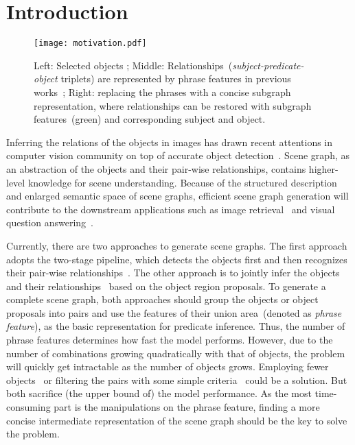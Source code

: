 \documentclass[runningheads]{llncs}
\begin{document}
\section{Introduction}

\begin{figure}[t]
\texttt{[image: motivation.pdf]}	
\caption{Left: Selected objects ; Middle: Relationships~(\emph{subject-predicate-object} triplets) are represented by phrase features in previous works~\cite{visual_relationship,visual_genome,li2017vip,li2017scene,xu2017scene,dai2017detecting,zhuang2017towards}; Right: replacing the phrases with a concise subgraph representation, where relationships can be restored with subgraph features~(green) and corresponding subject and object. }
\label{fig:motivation}
\end{figure}

Inferring the relations of the objects in images has drawn recent attentions in computer vision community on top of accurate object detection~\cite{visual_relationship,visual_genome,li2017vip,li2017scene,xu2017scene,dai2017detecting,zhuang2017towards}. Scene graph, as an abstraction of the objects and their pair-wise relationships, contains higher-level knowledge for scene understanding. Because of the structured description and enlarged semantic space of scene graphs, efficient scene graph generation will contribute to the downstream applications such as image retrieval~\cite{visual_phrase_for_retrieval, johnson2015image} and visual question answering~\cite{li2018visual, lu2018co-attending}.

Currently, there are two approaches to generate scene graphs. The first approach adopts the two-stage pipeline, which detects the objects first and then recognizes their pair-wise relationships~\cite{visual_relationship,xu2017scene,dai2017detecting,yu2017visual,liao2017natural}. The other approach is to jointly infer the objects and their relationships~\cite{li2017vip,li2017scene,xu2017scene} based on the object region proposals.  
To generate a complete scene graph, both approaches should group the objects or object proposals into pairs and use the features of their union area~(denoted as \emph{phrase feature}), as the basic representation for predicate inference. Thus, the number of phrase features determines how fast the model performs. However, due to the number of combinations growing quadratically with that of objects, the problem will quickly get intractable as the number of objects grows. Employing fewer objects~\cite{xu2017scene,li2017scene} or filtering the pairs with some simple criteria~\cite{li2017vip,dai2017detecting} could be a solution. But both sacrifice (the upper bound of) the model performance. As the most time-consuming part is the manipulations on the phrase feature, finding a more concise intermediate representation of the scene graph should be the key to solve the problem.
\end{document}
